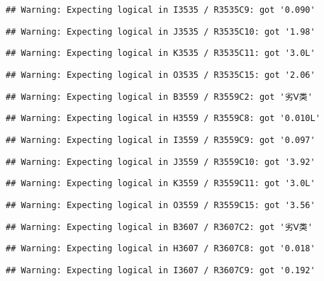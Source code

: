 \documentclass[
]{article}
\begin{document}
\begin{verbatim}
## Warning: Expecting logical in I3535 / R3535C9: got '0.090'
\end{verbatim}

\begin{verbatim}
## Warning: Expecting logical in J3535 / R3535C10: got '1.98'
\end{verbatim}

\begin{verbatim}
## Warning: Expecting logical in K3535 / R3535C11: got '3.0L'
\end{verbatim}

\begin{verbatim}
## Warning: Expecting logical in O3535 / R3535C15: got '2.06'
\end{verbatim}

\begin{verbatim}
## Warning: Expecting logical in B3559 / R3559C2: got '劣Ⅴ类'
\end{verbatim}

\begin{verbatim}
## Warning: Expecting logical in H3559 / R3559C8: got '0.010L'
\end{verbatim}

\begin{verbatim}
## Warning: Expecting logical in I3559 / R3559C9: got '0.097'
\end{verbatim}

\begin{verbatim}
## Warning: Expecting logical in J3559 / R3559C10: got '3.92'
\end{verbatim}

\begin{verbatim}
## Warning: Expecting logical in K3559 / R3559C11: got '3.0L'
\end{verbatim}

\begin{verbatim}
## Warning: Expecting logical in O3559 / R3559C15: got '3.56'
\end{verbatim}

\begin{verbatim}
## Warning: Expecting logical in B3607 / R3607C2: got '劣Ⅴ类'
\end{verbatim}

\begin{verbatim}
## Warning: Expecting logical in H3607 / R3607C8: got '0.018'
\end{verbatim}

\begin{verbatim}
## Warning: Expecting logical in I3607 / R3607C9: got '0.192'
\end{verbatim}
\end{document}
